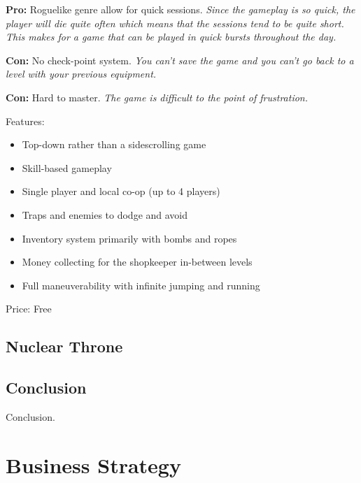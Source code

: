 \documentclass[12p]{article}
\begin{document}
\textbf{Pro:} Roguelike genre allow for quick sessions. \emph{Since the gameplay is so quick, the player will die quite often which means that the sessions tend to be quite short. This makes for a game that can be played in quick bursts throughout the day.}

\textbf{Con:} No check-point system. \emph{You can't save the game and you can't go back to a level with your previous equipment.}

\textbf{Con:} Hard to master. \emph{The game is difficult to the point of frustration.}

Features:

\begin{itemize}
  \item Top-down rather than a sidescrolling game
  \item Skill-based gameplay
  \item Single player and local co-op (up to 4 players)
  \item Traps and enemies to dodge and avoid
  \item Inventory system primarily with bombs and ropes
  \item Money collecting for the shopkeeper in-between levels
  \item Full maneuverability with infinite jumping and running
\end{itemize}

Price: Free


\subsection{Nuclear Throne}


\subsection{Conclusion}
Conclusion.


\newpage
\section{Business Strategy} \label{MarketAnalysis}
\end{document}

